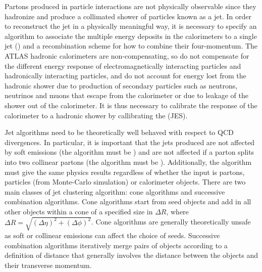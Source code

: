Partons produced in particle interactions are not physically observable since
they hadronize and produce a collimated shower of particles known as a jet. In
order to reconstruct the jet in a physically meaningful way, it is necessary to
specify an algorithm to associate the multiple energy deposits in the calorimeters
to a single jet () and a recombination scheme for how to combine their
four-momentum. The ATLAS hadronic calorimeters are non-compensating, so do not
compensate for the different energy response of electromagnetically interacting
particles and hadronically interacting particles, and do not account for energy 
lost from the hadronic shower due to production of
secondary particles such as neutrons, neutrinos and muons that escape from the calorimeter
or due to leakage of the shower out of the calorimeter. It is thus necessary to
calibrate the response of the calorimeter to a hadronic shower by callibrating
the  (JES).

Jet algorithms need to be theoretically well behaved with respect to QCD
divergences. In particular, it is important that the jets produced are not
affected by soft emissions (the algorithm must be ) and
are not affected if a parton splits into two collinear partons (the algorithm
must be ). Additionally, the algorithm must give the same
physics results regardless of whether the input is partons, particles (from
Monte-Carlo simulation) or calorimeter objects. There are two main classes of
jet clustering algorithm: cone algorithms and successive combination algorithms.
Cone algorithms start from seed objects and add in all other objects within a
cone of a specified size in $\Delta R$, where $\Delta R = \sqrt{(\Delta \eta)^{2} + (\Delta
\phi)^{2}} $. Cone algorithms are generally theoretically unsafe as soft or
collinear emissions can affect the choice of seeds. Successive combination
algorithms iteratively merge pairs of objects according to a definition of distance that
generally involves the distance between the objects and their transverse
momentum.

